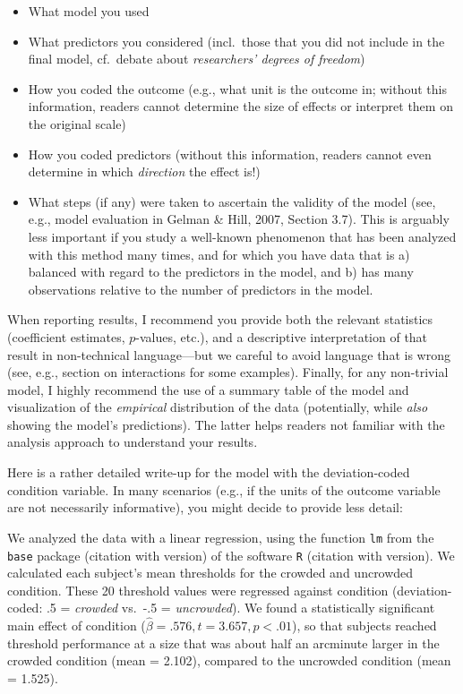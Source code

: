 \documentclass[
]{article}
\providecommand{\tightlist}{%
  \setlength{\itemsep}{0pt}\setlength{\parskip}{0pt}}
\begin{document}
\begin{itemize}
\tightlist
\item
  What model you used
\item
  What predictors you considered (incl.~those that you did not include
  in the final model, cf.~debate about \emph{researchers' degrees of
  freedom})
\item
  How you coded the outcome (e.g., what unit is the outcome in; without
  this information, readers cannot determine the size of effects or
  interpret them on the original scale)
\item
  How you coded predictors (without this information, readers cannot
  even determine in which \emph{direction} the effect is!)
\item
  What steps (if any) were taken to ascertain the validity of the model
  (see, e.g., model evaluation in Gelman \& Hill, 2007, Section 3.7).
  This is arguably less important if you study a well-known phenomenon
  that has been analyzed with this method many times, and for which you
  have data that is a) balanced with regard to the predictors in the
  model, and b) has many observations relative to the number of
  predictors in the model.
\end{itemize}

When reporting results, I recommend you provide both the relevant
statistics (coefficient estimates, \(p\)-values, etc.), and a
descriptive interpretation of that result in non-technical
language---but we careful to avoid language that is wrong (see, e.g.,
section on interactions for some examples). Finally, for any non-trivial
model, I highly recommend the use of a summary table of the model and
visualization of the \emph{empirical} distribution of the data
(potentially, while \emph{also} showing the model's predictions). The
latter helps readers not familiar with the analysis approach to
understand your results.

Here is a rather detailed write-up for the model with the
deviation-coded condition variable. In many scenarios (e.g., if the
units of the outcome variable are not necessarily informative), you
might decide to provide less detail:

\color{lightgray}

We analyzed the data with a linear regression, using the function
\texttt{lm} from the \texttt{base} package (citation with version) of
the software \texttt{R} (citation with version). We calculated each
subject's mean thresholds for the crowded and uncrowded condition. These
20 threshold values were regressed against condition (deviation-coded:
.5 = \emph{crowded} vs.~-.5 = \emph{uncrowded}). We found a
statistically significant main effect of condition
(\(\widehat{\beta}=.576, t=3.657, p<.01\)), so that subjects reached
threshold performance at a size that was about half an arcminute larger
in the crowded condition (mean = 2.102), compared to the uncrowded
condition (mean = 1.525). \color{black}
\end{document}
